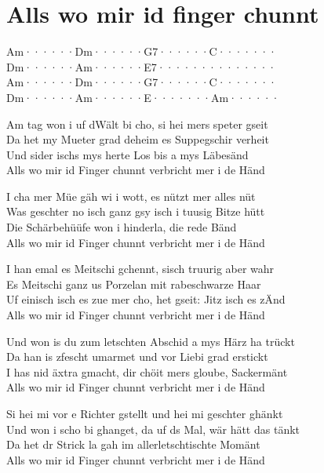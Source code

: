 \documentclass[
  letterpaper,
  twoside=false]{scrbook}
\begin{document}
\hypertarget{alls-wo-mir-id-finger-chunnt}{%
\chapter{Alls wo mir id finger
chunnt}\label{alls-wo-mir-id-finger-chunnt}}

\textbar Am······\textbar Dm······\textbar G7······\textbar C·······\textbar{}\\
\textbar Dm······\textbar Am······\textbar E7······\textbar········\textbar{}\\
\textbar Am······\textbar Dm······\textbar G7······\textbar C·······\textbar{}\\
\textbar Dm······\textbar Am······\textbar E·······\textbar Am······\textbar{}

Am tag won i uf d\textquotesingle Wält bi cho, si hei mers speter
gseit\\
Da het my Mueter grad deheim es Suppegschir verheit\\
Und sider ischs mys herte Los bis a mys Läbesänd\\
Alls wo mir id Finger chunnt verbricht mer i de Händ

I cha mer Müe gäh wi i wott, es nützt mer alles nüt\\
Was geschter no isch ganz gsy isch i tuusig Bitze hütt\\
Die Schärbehüüfe won i hinderla, die rede Bänd\\
Alls wo mir id Finger chunnt verbricht mer i de Händ

I han emal es Meitschi gchennt, s\textquotesingle isch truurig aber
wahr\\
Es Meitschi ganz us Porzelan mit rabeschwarze Haar\\
Uf einisch isch es zue mer cho, het gseit: Jitz isch es
z\textquotesingle Änd\\
Alls wo mir id Finger chunnt verbricht mer i de Händ

Und won i\textquotesingle s du zum letschten Abschid a mys Härz ha
trückt\\
Da han i\textquotesingle s z\textquotesingle fescht umarmet und vor
Liebi grad erstickt\\
I has nid äxtra gmacht, dir chöit mers gloube, Sackermänt\\
Alls wo mir id Finger chunnt verbricht mer i de Händ

Si hei mi vor e Richter gstellt und hei mi geschter ghänkt\\
Und won i scho bi ghanget, da uf ds Mal, wär hätt das tänkt\\
Da het dr Strick la gah im allerletschtischte Momänt\\
Alls wo mir id Finger chunnt verbricht mer i de Händ
\end{document}
